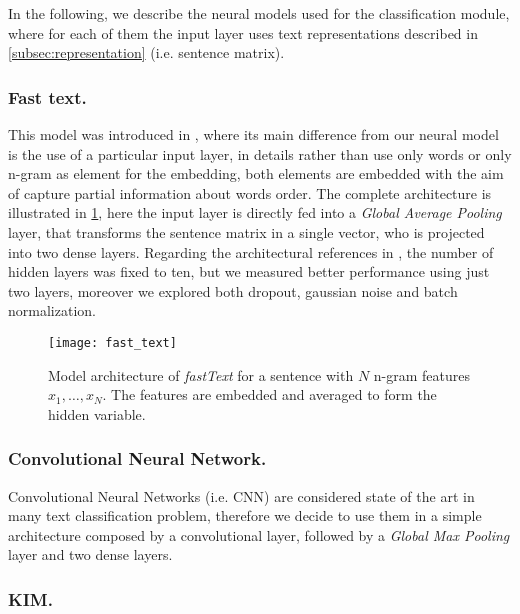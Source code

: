 In the following, we describe the neural models used for the classification module, where for each of them the input layer uses text representations described in \cref{subsec:representation} (i.e. sentence matrix).


\subsubsection{Fast text.}

This model was introduced in \cite{joulin2016bag}, where its main difference from our neural model is the use of a particular input layer, in details rather than use only words or only n-gram as element for the embedding, both elements are embedded with the aim of capture partial information about words order.
The complete architecture is illustrated in \cref{fig:fastText}, here the input layer is directly fed into a \emph{Global Average Pooling} layer, that transforms the sentence matrix in a single vector, who is projected into two dense layers.
Regarding the architectural references in \cite{joulin2016bag}, the number of hidden layers was fixed to ten, but we measured better performance using just two layers, moreover we explored both dropout, gaussian noise and batch normalization.

\begin{figure}[h]
\footnotesize
\centering
\texttt{[image: fast\_text]}
\caption{\cite{joulin2016bag} Model architecture of \emph{fastText} for a sentence with $N$ n-gram features $x_1,\dots,x_N$. The features are embedded and averaged to form the hidden variable.}
\label{fig:fastText}
\end{figure}


\subsubsection{Convolutional Neural Network.}
Convolutional Neural Networks (i.e. CNN) are considered state of the art in many text classification problem, therefore we decide to use them in a simple architecture composed by a convolutional layer, followed by a \emph{Global Max Pooling} layer and two dense layers.

\subsubsection{KIM.}

